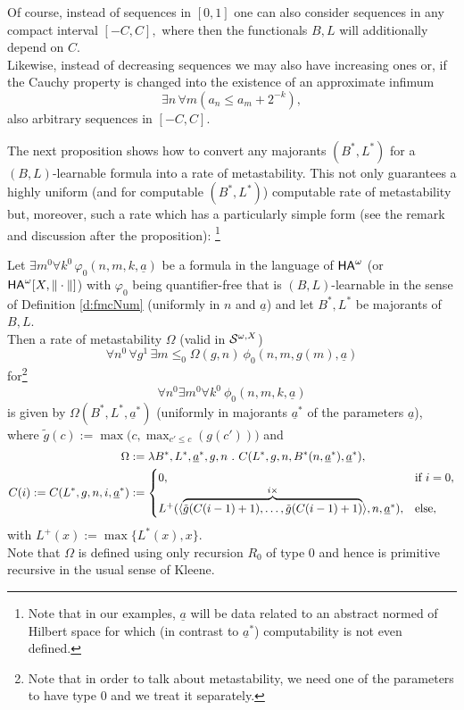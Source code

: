 \begin{remark}
Of course, instead of sequences in $[0,1]$ one can also consider sequences 
in any compact interval $[-C,C],$ where then the functionals $B,L$ will 
additionally depend on $C.$ \\[1mm] Likewise, instead of decreasing 
sequences we may also have increasing ones or, if the Cauchy property 
is changed into the existence of an approximate infimum 
\[ \exists n\,\forall m (a_n\le a_m+2^{-k}), \] 
also arbitrary sequences in $[-C,C].$
\end{remark}
The next proposition shows how to convert any majorants $(B^*,L^*)$ for 
a $(B,L)$-learnable formula into a rate of metastability. This not only 
guarantees a highly uniform (and for computable $(B^*,L^*)$) computable 
rate of metastability but, moreover, such a rate which has a particularly 
simple form (see the remark and discussion after the proposition):
\footnote{Note that in our examples, $\underline{a}$ will be data related to 
an abstract normed of Hilbert space for which (in contrast to 
$\underline{a}^*$) computability is not even defined.} 
\begin{prop}\label{p:bg2meta}
Let $\exists m^0\forall k^0\,\varphi_0(n,m,k,\underline{a})$ be a formula 
in the language of ${\textsf{\upshape HA}}^\omega$ (or ${\textsf{\upshape HA}}^\omega[X,\|\cdot\|]$) with $\varphi_0$ being 
quantifier-free that 
is $(B,L)$-learnable in the sense of Definition \ref{d:fmcNum}  
(uniformly in $n$ and  $\underline{a}$) and let $B^*,L^*$ be majorants of  
$B,L$. \\ 
Then a rate of metastability $\Omega$ 
(valid in ${\cal S}^{\omega,X}$) 
\[ \forall n^0\,\forall g^1\, \exists m\le_0\Omega(g,n) \ 
\phi_0(n,m,g(m),\underline{a})\tag{metastable} \label{(metastable)}\]
for\footnote{Note that in order to talk about metastability, we need  one of the parameters to have type 0 and we treat it separately.}  
\[
\forall n^0 \exists m^0 \forall k^0\ \phi_0(n,m,k,\underline{a})\tag{$\phi$}\label{e:phi}
\]
is given by $\Omega(B^*,L^*,\underline{a}^*)$ 
(uniformly in majorants $\underline{a}^*$ of 
the parameters $\underline{a}$), where 
$\tilde g(c):=\max\big(c,\max_{c'\leq c}(g(c'))\big)$ and
\begin{align*} 
  \Omega&:=\lambda B^*,L^*,\underline{a}^*,g,n\ .\ C(L^*,g,n,
B^*(n,\underline{a}^*),\underline{a}^*),\\
C(i):=C(L^*,g,n,i,\underline{a}^*)&:=
\begin{cases}0,&\text{if}\ i=0,\\ L^+(\langle\overbrace{ \tilde g(C(i-1)+1),\ldots,\tilde g(C(i-1)+1) }^{i\times}\rangle,n,\underline{a}^*),&\text{else},\end{cases}
\end{align*}
with $L^+(x):=\max\{ L^*(x),x\}.$ \\ 
Note that $\Omega$ is defined using only recursion $R_0$ of type $0$ and 
hence is primitive recursive in the usual sense of Kleene.
\end{prop}
